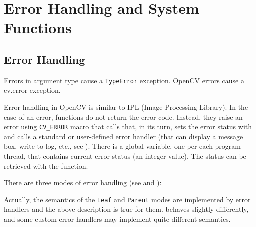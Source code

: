 \fi

\section{Error Handling and System Functions}

\subsection{Error Handling}

\ifPython
Errors in argument type cause a \texttt{TypeError} exception.
OpenCV errors cause a cv.error exception.
\fi

\ifC
Error handling in OpenCV is similar to IPL (Image Processing
Library). In the case of an error, functions do not return the error
code. Instead, they raise an error using \texttt{CV\_ERROR}
macro that calls  that, in its turn, sets the error
status with  and calls a standard or user-defined
error handler (that can display a message box, write to log, etc., see
).  There is a global variable, one per each program
thread, that contains current error status (an integer value). The status
can be retrieved with the  function.

There are three modes of error handling (see  and
):

\begin{description}
\end{description}

Actually, the semantics of the \texttt{Leaf} and \texttt{Parent} modes are implemented by error handlers and the above description is true for them.  behaves slightly differently, and some custom error handlers may implement quite different semantics.  

\label{ERROR Handling Macros}

